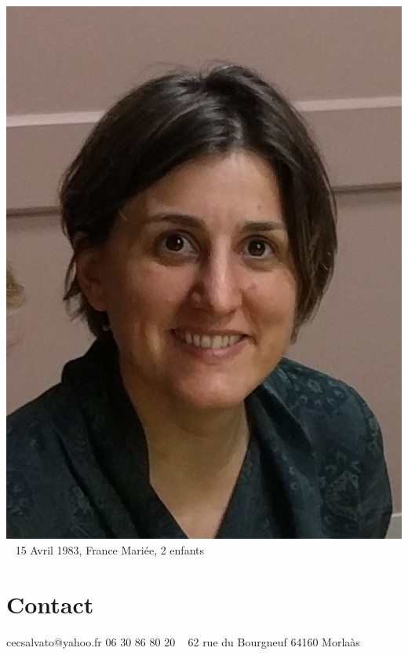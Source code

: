 \documentclass{../cv-style}     %
\begin{document}


\begin{aside}
    \includegraphics[width=.9\columnwidth]{cecile}
    ~
    15 Avril 1983, France
    Mariée, 2 enfants
    \section{Contact}
    \faEnvelope{} cecsalvato@yahoo.fr
    \faPhone{} 06 30 86 80 20
    ~
    \faHome{} 62 rue du Bourgneuf
    64160 Morlaàs
\end{aside}
\end{document}
